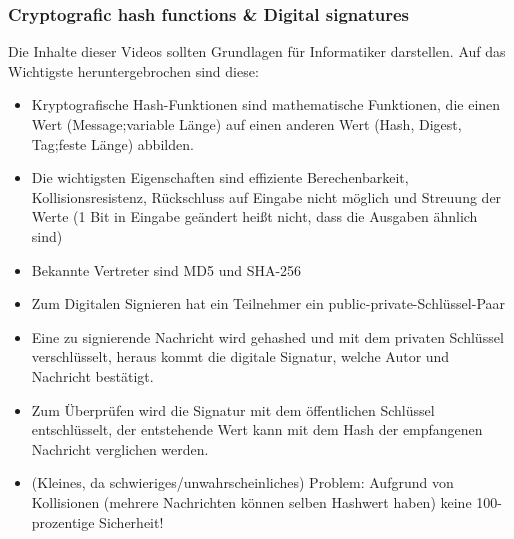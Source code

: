 \documentclass{article} %
\begin{document}
	\subsubsection{Cryptografic hash functions \& Digital signatures}
	Die Inhalte dieser Videos sollten Grundlagen für Informatiker darstellen.
	Auf das Wichtigste heruntergebrochen sind diese:
	\begin{itemize}
		\item Kryptografische Hash-Funktionen sind mathematische Funktionen, die einen Wert (Message;variable Länge) auf einen anderen Wert (Hash, Digest, Tag;feste Länge) abbilden.
		\item Die wichtigsten Eigenschaften sind effiziente Berechenbarkeit, Kollisionsresistenz, Rückschluss auf Eingabe nicht möglich und Streuung der Werte (1 Bit in Eingabe geändert heißt nicht, dass die Ausgaben ähnlich sind)
		\item Bekannte Vertreter sind MD5 und SHA-256
		\item Zum Digitalen Signieren hat ein Teilnehmer ein public-private-Schlüssel-Paar
		\item Eine zu signierende Nachricht wird gehashed und mit dem privaten Schlüssel verschlüsselt, heraus kommt die digitale Signatur, welche Autor und Nachricht bestätigt.
		\item Zum Überprüfen wird die Signatur mit dem öffentlichen Schlüssel entschlüsselt, der entstehende Wert kann mit dem Hash der empfangenen Nachricht verglichen werden.
		\item (Kleines, da schwieriges/unwahrscheinliches) Problem: Aufgrund von Kollisionen (mehrere Nachrichten können selben Hashwert haben) keine 100-prozentige Sicherheit!
	\end{itemize}
\end{document}

